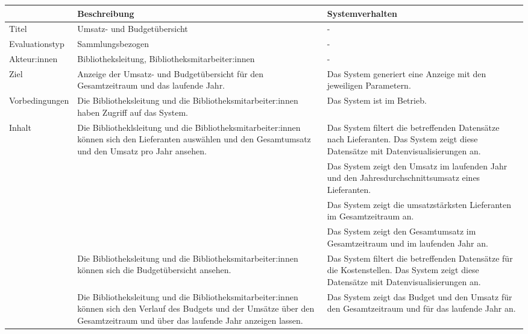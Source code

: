\begingroup
\setlength{\tabcolsep}{9pt} %
\renewcommand{\arraystretch}{1.10} 
\begin{table}[h]
    \centering
    \begin{adjustbox}{max width=\textwidth}
    \begin{tabular}{lp{7.0cm}p{7.0cm}}
       \toprule
       \textbf{}          & \textbf{Beschreibung} &\textbf{Systemverhalten}\\
       \midrule
        Titel                            &Umsatz- und Budgetübersicht& -\\
        Evaluationstyp                   &Sammlungsbezogen                   & -\\
        Akteur:innen                     &Bibliotheksleitung, Bibliotheksmitarbeiter:innen& -\\
        Ziel                             &Anzeige der Umsatz- und Budgetübersicht für den Gesamtzeitraum und das laufende Jahr.& Das System generiert eine Anzeige mit den jeweiligen Parametern.\\
        Vorbedingungen                   &Die Bibliotheksleitung und die Bibliotheksmitarbeiter:innen haben Zugriff auf das System.& Das System ist im Betrieb.\\
        Inhalt                           &Die Bibliotheklsleitung und die Bibliotheksmitarbeiter:innen können sich den Lieferanten auswählen und den Gesamtumsatz und den Umsatz pro Jahr ansehen.& Das System filtert die betreffenden Datensätze nach Lieferanten. Das System zeigt diese Datensätze mit Datenvisualisierungen an.\\
                                        & &Das System zeigt den Umsatz im laufenden Jahr und den Jahresdurchschnittsumsatz eines Lieferanten.\\
                                        & &Das System zeigt die umsatzstärksten Lieferanten im Gesamtzeitraum an.\\
                                        & &Das System zeigt den Gesamtumsatz im Gesamtzeitraum und im laufenden Jahr an.\\
                                         &Die Bibliotheksleitung und die Bibliotheksmitarbeiter:innen können sich die Budgetübersicht ansehen. &Das System filtert die betreffenden Datensätze für die Kostenstellen. Das System zeigt diese Datensätze mit Datenvisualisierungen an.\\
                                         &Die Bibliotheksleitung und die Bibliotheksmitarbeiter:innen können sich den Verlauf des Budgets und der Umsätze über den Gesamtzeitraum und über das laufende Jahr anzeigen lassen. &Das System zeigt das Budget und den Umsatz für den Gesamtzeitraum und für das laufende Jahr an.\\

\end{tabular}
\end{adjustbox}
\end{table}
